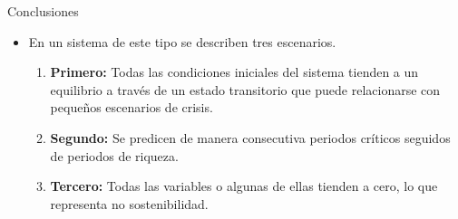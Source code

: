 \documentclass{beamer}
\begin{document}
\begin{frame}{Conclusiones}
\begin{itemize}
\item En un sistema de este tipo se describen tres escenarios.\vspace{0.4cm}
\begin{enumerate}
\setlength\itemsep{1em}
    \item \textbf{Primero:} Todas las condiciones iniciales del sistema tienden a un equilibrio a través de un estado transitorio que puede relacionarse con pequeños escenarios de crisis.
    \item \textbf{Segundo:} Se predicen de manera consecutiva periodos críticos seguidos de periodos de riqueza.
    \item \textbf{Tercero:} Todas las variables o algunas de ellas tienden a cero, lo que representa no sostenibilidad.
\end{enumerate}
\end{itemize}
\end{frame}
\end{document}

